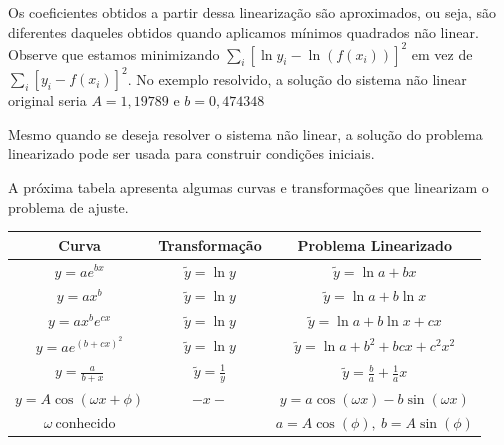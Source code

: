 \begin{obs}
Os coeficientes obtidos a partir dessa linearização são aproximados, ou seja, são diferentes daqueles obtidos quando aplicamos mínimos quadrados não linear. Observe que estamos minimizando $\displaystyle\sum_i [\ln y_i -\ln (f(x_i))]^2$ em vez de $\displaystyle\sum_i [ y_i -f(x_i)]^2$. No exemplo resolvido, a solução do sistema não linear original seria $A=1,19789$ e $b=0,474348$
\end{obs}

\begin{obs}
Mesmo quando se deseja resolver o sistema não linear, a solução do problema linearizado pode ser usada para construir condições iniciais.
\end{obs}


A próxima tabela apresenta algumas curvas e transformações que linearizam o problema de ajuste.
\begin{center}
  \begin{tabular}{|c|c|c|}\hline
Curva    & Transformação & Problema Linearizado\\ \hline
$\displaystyle y=ae^{bx}$       & $\tilde y=\ln y$   & $\tilde y=\ln a+ bx$\\
$\displaystyle y=ax^b $       &$\tilde y=\ln y$   & $\tilde y=\ln a+ b\ln x$\\
$\displaystyle y=ax^be^{cx}$    &$\tilde y=\ln y$  & $\tilde y=\ln a+ b\ln x+cx$\\
$\displaystyle y=ae^{(b+cx)^2}$ &$\tilde y=\ln y$       & $\tilde y=\ln a+b^2+ bc x+c^2x^2$\\
$\displaystyle y=\frac{a}{b+x}$ &$\displaystyle \tilde y=\frac{1}{y}$ & $\displaystyle \tilde y=\frac{b}{a}+\frac{1}{a}x$\\
$y=A\cos(\omega x+\phi)$   & $-x-$ &  $y=a\cos(\omega x)-b\sin(\omega x)$ \\
$\omega\ \text{conhecido} $&   &  $a=A\cos(\phi),\ b=A\sin(\phi)$ \\ \hline    
  \end{tabular}
\end{center}

